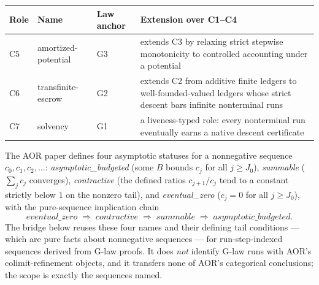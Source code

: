 \documentclass[11pt]{article}
\theoremstyle{definition}
\begin{document}
\begin{center}
\small
\begin{tabularx}{\textwidth}{@{}lllX@{}}
\toprule
Role & Name & Law anchor & Extension over C1--C4 \\
\midrule
C5 & amortized-potential & G3 & extends C3 by relaxing strict stepwise monotonicity to controlled
accounting under a potential \\
C6 & transfinite-escrow & G2 & extends C2 from additive finite ledgers to well-founded-valued
ledgers whose strict descent bars infinite nonterminal runs \\
C7 & solvency & G1 & a liveness-typed role: every nonterminal run eventually earns a native descent
certificate \\
\bottomrule
\end{tabularx}
\end{center}

The AOR paper defines four asymptotic statuses for a nonnegative sequence $c_0, c_1, c_2, \ldots$:
\emph{asymptotic\_budgeted} (some $B$ bounds $c_j$ for all $j \ge J_0$), \emph{summable}
($\sum_j c_j$ converges), \emph{contractive} (the defined ratios $c_{j+1}/c_j$ tend to a constant
strictly below $1$ on the nonzero tail), and \emph{eventual\_zero} ($c_j = 0$ for all $j \ge J_0$),
with the pure-sequence implication chain
\[
  \textit{eventual\_zero} \;\Longrightarrow\; \textit{contractive} \;\Longrightarrow\;
  \textit{summable} \;\Longrightarrow\; \textit{asymptotic\_budgeted}.
\]
The bridge below reuses these four names and their defining tail conditions --- which are pure facts
about nonnegative sequences --- for run-step-indexed sequences derived from G-law proofs. It does
\emph{not} identify G-law runs with AOR's colimit-refinement objects, and it transfers none of AOR's
categorical conclusions; the scope is exactly the sequences named.
\end{document}
